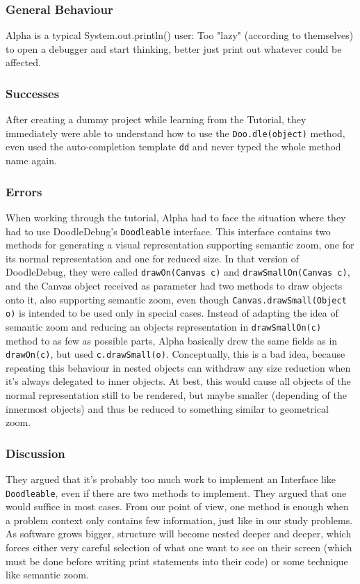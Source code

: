 \documentclass[a4paper,ngerman,english]{amsbook} %
\begin{document}
\subsubsection{General Behaviour}
Alpha is a typical System.out.println() user: Too "lazy" (according to themselves) to open a debugger and start thinking, better just print out whatever could be affected.
\subsubsection{Successes}
After creating a dummy project while learning from the Tutorial, they immediately were able to understand how to use the \verb-Doo.dle(object)- method, even used the auto-completion template \verb.dd. and never typed the whole method name again.
\subsubsection{Errors}
When working through the tutorial, Alpha had to face the situation where they had to use DoodleDebug's \verb.Doodleable. interface. This interface contains two methods for generating a visual representation supporting semantic zoom, one for its normal representation and one for reduced size. In that version of DoodleDebug, they were called \verb.drawOn(Canvas c). and \verb.drawSmallOn(Canvas c)., and the Canvas object received as parameter had two methods to draw objects onto it, also supporting semantic zoom, even though \verb-Canvas.drawSmall(Object o)- is intended to be used only in special cases. Instead of adapting the idea of semantic zoom and reducing an objects representation in \verb.drawSmallOn(c). method to as few as possible parts, Alpha basically drew the same fields as in \verb.drawOn(c)., but used \verb-c.drawSmall(o)-. Conceptually, this is a bad idea, because repeating this behaviour in nested objects can withdraw any size reduction when it's always delegated to inner objects. At best, this would cause all objects of the normal representation still to be rendered, but maybe smaller (depending of the innermost objects) and thus be reduced to something similar to geometrical zoom.
\subsubsection{Discussion}
They argued that it's probably too much work to implement an Interface like \verb.Doodleable., even if there are two methods to implement. They argued that one would suffice in most cases. From our point of view, one method is enough when a problem context only contains few information, just like in our study problems. As software grows bigger, structure will become nested deeper and deeper, which forces either very careful selection of what one want to see on their screen (which must be done before writing print statements into their code) or some technique like semantic zoom.
\end{document}
